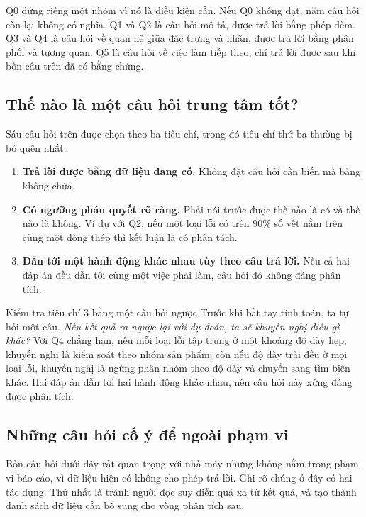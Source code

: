 \documentclass[12pt]{article}
\begin{document}
\noindent Q0 đứng riêng một nhóm vì nó là điều kiện cần. Nếu Q0 không đạt, năm câu hỏi còn lại không có nghĩa. Q1 và Q2 là câu hỏi mô tả, được trả lời bằng phép đếm. Q3 và Q4 là câu hỏi về quan hệ giữa đặc trưng và nhãn, được trả lời bằng phân phối và tương quan. Q5 là câu hỏi về việc làm tiếp theo, chỉ trả lời được sau khi bốn câu trên đã có bằng chứng.

\subsection{Thế nào là một câu hỏi trung tâm tốt?}

Sáu câu hỏi trên được chọn theo ba tiêu chí, trong đó tiêu chí thứ ba thường bị bỏ quên nhất.

\begin{enumerate}
  \item \textbf{Trả lời được bằng dữ liệu đang có.} Không đặt câu hỏi cần biến mà bảng không chứa.
  \item \textbf{Có ngưỡng phán quyết rõ ràng.} Phải nói trước được thế nào là có và thế nào là không. Ví dụ với Q2, nếu một loại lỗi có trên 90\% số vết nằm trên cùng một dòng thép thì kết luận là có phân tách.
  \item \textbf{Dẫn tới một hành động khác nhau tùy theo câu trả lời.} Nếu cả hai đáp án đều dẫn tới cùng một việc phải làm, câu hỏi đó không đáng phân tích.
\end{enumerate}

\begin{guidelinebox}{Kiểm tra tiêu chí 3 bằng một câu hỏi ngược}
Trước khi bắt tay tính toán, ta tự hỏi một câu. \emph{Nếu kết quả ra ngược lại với dự đoán, ta sẽ khuyến nghị điều gì khác?} Với Q4 chẳng hạn, nếu mỗi loại lỗi tập trung ở một khoảng độ dày hẹp, khuyến nghị là kiểm soát theo nhóm sản phẩm; còn nếu độ dày trải đều ở mọi loại lỗi, khuyến nghị là ngừng phân nhóm theo độ dày và chuyển sang tìm biến khác. Hai đáp án dẫn tới hai hành động khác nhau, nên câu hỏi này xứng đáng được phân tích.
\end{guidelinebox}

\subsection{Những câu hỏi cố ý để ngoài phạm vi}

Bốn câu hỏi dưới đây rất quan trọng với nhà máy nhưng không nằm trong phạm vi báo cáo, vì dữ liệu hiện có không cho phép trả lời. Ghi rõ chúng ở đây có hai tác dụng. Thứ nhất là tránh người đọc suy diễn quá xa từ kết quả, và tạo thành danh sách dữ liệu cần bổ sung cho vòng phân tích sau.
\end{document}
